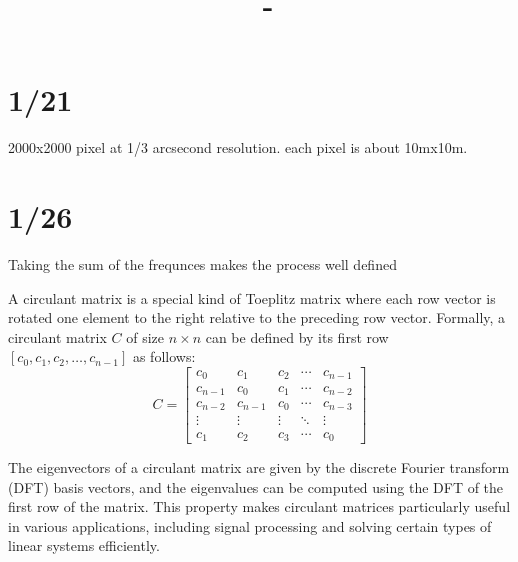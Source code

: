 \documentclass[answers,12pt,addpoints]{exam}
\author{\name}
\title{\course \ - \assignment}
\begin{document}
\maketitle
\tableofcontents
\newpage
\section{1/21}
\begin{example}
    2000x2000 pixel at 1/3 arcsecond resolution. each pixel is about 10mx10m.\\ 
\end{example}
\section{1/26}
Taking the sum of the frequnces makes the process well defined

\begin{definition}
    A circulant matrix is a special kind of Toeplitz matrix where each row vector is rotated one element to the right relative to the preceding row vector. Formally, a circulant matrix \( C \) of size \( n \times n \)
    can be defined by its first row \( [c_0, c_1, c_2, \ldots, c_{n-1}] \) as follows:
    \[
    C = \begin{bmatrix}
    c_0 & c_1 & c_2 & \cdots & c_{n-1} \\
    c_{n-1} & c_0 & c_1 & \cdots & c_{n-2} \\
    c_{n-2} & c_{n-1} & c_0 & \cdots & c_{n-3} \\
    \vdots & \vdots & \vdots & \ddots & \vdots \\
    c_1 & c_2 & c_3 & \cdots & c_0
    \end{bmatrix}
    \]

    The eigenvectors of a circulant matrix are given by the discrete Fourier transform (DFT) basis vectors, and the eigenvalues can be computed using the DFT of the first row of the matrix. This property makes circulant matrices particularly useful in various applications, including signal processing and solving certain types of linear systems efficiently.

\end{definition}
\end{document}
